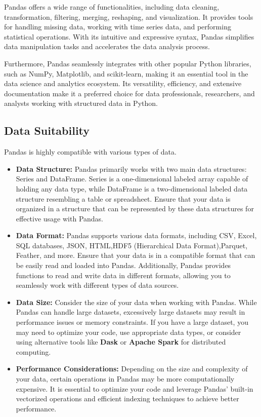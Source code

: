 Pandas offers a wide range of functionalities, including data cleaning, transformation, filtering, merging, reshaping, and visualization. It provides tools for handling missing data, working with time series data, and performing statistical operations. With its intuitive and expressive syntax, Pandas simplifies data manipulation tasks and accelerates the data analysis process.

Furthermore, Pandas seamlessly integrates with other popular Python libraries, such as NumPy, Matplotlib, and scikit-learn, making it an essential tool in the data science and analytics ecosystem. Its versatility, efficiency, and extensive documentation make it a preferred choice for data professionals, researchers, and analysts working with structured data in Python.

\subsection{Data Suitability}

Pandas is highly compatible with various types of data.

\begin{itemize}
	\item \textbf{Data Structure:} Pandas primarily works with two main data structures: Series and DataFrame. Series is a one-dimensional labeled array capable of holding any data type, while DataFrame is a two-dimensional labeled data structure resembling a table or spreadsheet. Ensure that your data is organized in a structure that can be represented by these data structures for effective usage with Pandas.
	\item \textbf{Data Format:} Pandas supports various data formats, including CSV, Excel, SQL databases, JSON, HTML,HDF5 (Hierarchical Data Format),Parquet, Feather, and more. Ensure that your data is in a compatible format that can be easily read and loaded into Pandas. Additionally, Pandas provides functions to read and write data in different formats, allowing you to seamlessly work with different types of data sources.
	\item \textbf{Data Size:} Consider the size of your data when working with Pandas. While Pandas can handle large datasets, excessively large datasets may result in performance issues or memory constraints. If you have a large dataset, you may need to optimize your code, use appropriate data types, or consider using alternative tools like \textbf{Dask} or \textbf{Apache Spark} for distributed computing.
	\item \textbf{Performance Considerations:} Depending on the size and complexity of your data, certain operations in Pandas may be more computationally expensive. It is essential to optimize your code and leverage Pandas' built-in vectorized operations and efficient indexing techniques to achieve better performance.
\end{itemize}

